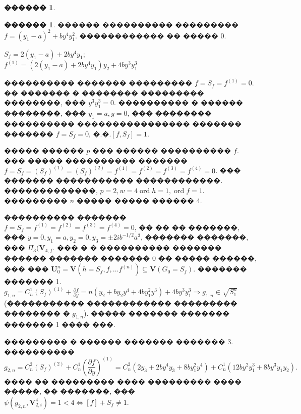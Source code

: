 \documentclass[16pt]{article}
\DeclareMathOperator{\ord}{ord}
\theoremstyle{plain}
\theoremstyle{definition}
\newtheorem{example}[theorem]{������}
\theoremstyle{remark}
\begin{document}
\begin{example}
\end{example}



\begin{example}
 ������ ���������� ��������� $f =
(y_1-a)^2+by^4y_1^2$. ������������ �� ����� 0.

$S_f=2(y_1-a)+2by^4y_1$;
\\
$f^{(1)}=(2(y_1-a)+2by^4y_1)y_2+4by^3y_1^3$

���������� ������� ��������� $f=S_f=f^{(1)}=0$. �� ������� �
�������� ��������� ��������, ��� $y^3y_1^3=0$. ���������� � ������
��������, ��� $y_1=a, y=0$, ��� �������� ���������� ����������������
������� ������� $f=S_f=0$, �.�.$[f,S_f]=1$.

����� ������  $p$ ��� ������ ���������� $f$. ��� ����� ����������
������� $f=S_f=(S_f)^{(1)}=(S_f)^{(2)}=f^{(1)}=f^{(2)}=f^{(3)}=f^{(4)}=0$. ��� ������� ����������� ������������. �������������,
$p=2,w=4\ord{h}=1,\ord{f}=1$. ��������� $n$  ����� ����� ������ 4.

���������� ������� $f=S_f=f^{(1)}=f^{(2)}=f^{(3)}=f^{(4)}=0$, �� �� �� �������, ��� $y=0,y_1=a,y_2=0,y_3=\pm2ib^{-1/2}a^3$, ������� �������, ��� $\Pi_3(\mathbf{V}_{4,f}$. 
��� � � ���������� ������� ������ ������� ������� 0 �� ����� ������, ��� ��� $\mathbf{U}_0^n = \mathbf{V}(h=S_f,f,\ldots f^{(n)})\subseteq\mathbf{V}(G_0=S_f)$.  ������� ������� 1. $g_{1,n}=C_n^1(S_f)^{(1)}+\frac{\partial f}{\partial y}=n(y_2+by_2y^4+4by_1^2y^3)+4by^3y_1^3\Rightarrow g_{1,n}\in\sqrt{S_1^n}$ (����������� ������������ ��������� �������� � $g_{1,n}$).  ����� ������� ������� ������� 1 ���� ���.

��������� � ������ ������� ������� 3. ���������� $$g_{2,n}=C_n^2(S_f)^{(2)}+C_n^1\left(\frac{\partial
f}{\partial
y}\right)^{(1)}=C_n^2(2y_3+2by^4y_3+8by_1^2y^4)+C_n^1(12by^2y_1^3+8by^3y_1y_2).$$
���� �� ��������� ���� ��������� ���� �����, �� �������, ���
$\psi(g_{2,n},\mathbf{V}_{2,i}^4)= 1 <4\Leftrightarrow [f]+S_f\not=1.$


\end{example}
\end{document}

